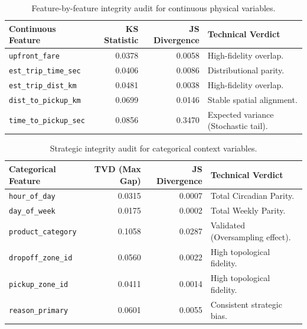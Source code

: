 \begin{table}[H]
    \centering
    \small
    \begin{tabularx}{\textwidth}{l r r X}
        \toprule
        \textbf{Continuous Feature} & \textbf{KS Statistic} & \textbf{JS Divergence} & \textbf{Technical Verdict} \\
        \midrule
        \texttt{upfront\_fare} & 0.0378 & 0.0058 & High-fidelity overlap. \\
        \texttt{est\_trip\_time\_sec} & 0.0406 & 0.0086 & Distributional parity. \\
        \texttt{est\_trip\_dist\_km} & 0.0481 & 0.0038 & High-fidelity overlap. \\
        \texttt{dist\_to\_pickup\_km} & 0.0699 & 0.0146 & Stable spatial alignment. \\
        \texttt{time\_to\_pickup\_sec} & 0.0856 & 0.3470 & Expected variance (Stochastic tail). \\
        \bottomrule
    \end{tabularx}
    \caption{Feature-by-feature integrity audit for continuous physical variables.}
    \label{tab:continuous_audit}
\end{table}

\begin{table}[H]
    \centering
    \small
    \begin{tabularx}{\textwidth}{l r r X}
        \toprule
        \textbf{Categorical Feature} & \textbf{TVD (Max Gap)} & \textbf{JS Divergence} & \textbf{Technical Verdict} \\
        \midrule
        \texttt{hour\_of\_day} & 0.0315 & 0.0007 & Total Circadian Parity. \\
        \texttt{day\_of\_week} & 0.0175 & 0.0002 & Total Weekly Parity. \\
        \texttt{product\_category} & 0.1058 & 0.0287 & Validated (Oversampling effect). \\
        \texttt{dropoff\_zone\_id} & 0.0560 & 0.0022 & High topological fidelity. \\
        \texttt{pickup\_zone\_id} & 0.0411 & 0.0014 & High topological fidelity. \\
        \texttt{reason\_primary} & 0.0601 & 0.0055 & Consistent strategic bias. \\
        \bottomrule
    \end{tabularx}
    \caption{Strategic integrity audit for categorical context variables.}
    \label{tab:categorical_audit}
\end{table}

